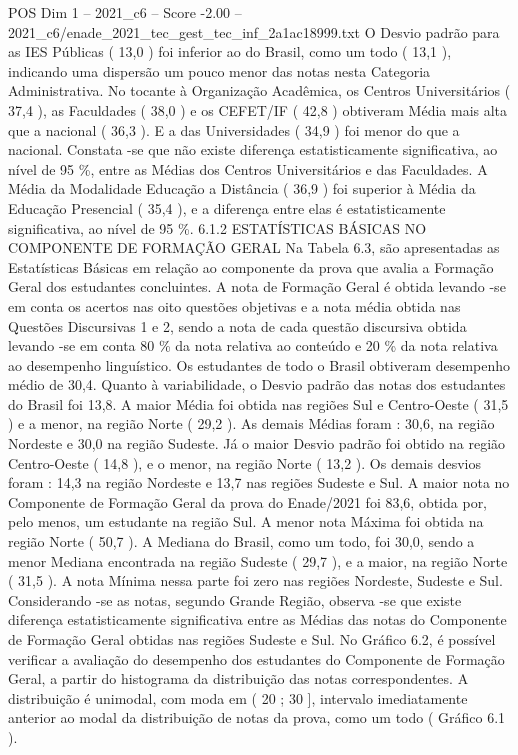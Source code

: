 \begin{textsample}{POS Dim 1 – 2021\_c6 – Score -2.00 – 2021\_c6/enade\_2021\_tec\_gest\_tec\_inf\_2a1ac18999.txt}
O Desvio padrão para as IES Públicas ( 13,0 ) foi inferior ao do Brasil, como um todo ( 13,1 ), indicando uma dispersão um pouco menor das notas nesta Categoria Administrativa.
No tocante à Organização Acadêmica, os Centros Universitários ( 37,4 ), as Faculdades ( 38,0 ) e os CEFET/IF ( 42,8 ) obtiveram Média mais alta que a nacional ( 36,3 ).
E a das Universidades ( 34,9 ) foi menor do que a nacional.
Constata -se que não existe diferença estatisticamente significativa, ao nível de 95 \%, entre as Médias dos Centros Universitários e das Faculdades.
A Média da Modalidade Educação a Distância ( 36,9 ) foi superior à Média da Educação Presencial ( 35,4 ), e a diferença entre elas é estatisticamente significativa, ao nível de 95 \%. 6.1.2 ESTATÍSTICAS BÁSICAS NO COMPONENTE DE FORMAÇÃO GERAL Na Tabela 6.3, são apresentadas as Estatísticas Básicas em relação ao componente da prova que avalia a Formação Geral dos estudantes concluintes.
A nota de Formação Geral é obtida levando -se em conta os acertos nas oito questões objetivas e a nota média obtida nas Questões Discursivas 1 e 2, sendo a nota de cada questão discursiva obtida levando -se em conta 80 \% da nota relativa ao conteúdo e 20 \% da nota relativa ao desempenho linguístico.
Os estudantes de todo o Brasil obtiveram desempenho médio de 30,4.
Quanto à variabilidade, o Desvio padrão das notas dos estudantes do Brasil foi 13,8.
A maior Média foi obtida nas regiões Sul e Centro-Oeste ( 31,5 ) e a menor, na região Norte ( 29,2 ).
As demais Médias foram : 30,6, na região Nordeste e 30,0 na região Sudeste.
Já o maior Desvio padrão foi obtido na região Centro-Oeste ( 14,8 ), e o menor, na região Norte ( 13,2 ).
Os demais desvios foram : 14,3 na região Nordeste e 13,7 nas regiões Sudeste e Sul.
A maior nota no Componente de Formação Geral da prova do Enade/2021 foi 83,6, obtida por, pelo menos, um estudante na região Sul.
A menor nota Máxima foi obtida na região Norte ( 50,7 ).
A Mediana do Brasil, como um todo, foi 30,0, sendo a menor Mediana encontrada na região Sudeste ( 29,7 ), e a maior, na região Norte ( 31,5 ).
A nota Mínima nessa parte foi zero nas regiões Nordeste, Sudeste e Sul.
Considerando -se as notas, segundo Grande Região, observa -se que existe diferença estatisticamente significativa entre as Médias das notas do Componente de Formação Geral obtidas nas regiões Sudeste e Sul.
No Gráfico 6.2, é possível verificar a avaliação do desempenho dos estudantes do Componente de Formação Geral, a partir do histograma da distribuição das notas correspondentes.
A distribuição é unimodal, com moda em ( 20 ; 30 ], intervalo imediatamente anterior ao modal da distribuição de notas da prova, como um todo ( Gráfico 6.1 ).

\end{textsample}
